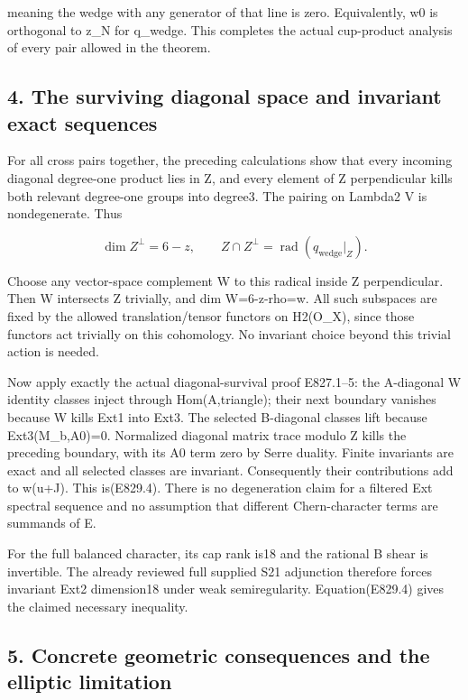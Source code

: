 meaning the wedge with any generator of that line is zero. Equivalently, w0
is orthogonal to z\_N for q\_wedge. This completes the actual cup-product
analysis of every pair allowed in the theorem.

\subsection{4. The surviving diagonal space and invariant exact
sequences}\label{SF-E829:the-surviving-diagonal-space-and-invariant-exact-sequences}

For all cross pairs together, the preceding calculations show that every
incoming diagonal degree-one product lies in Z, and every element of Z
perpendicular kills both relevant degree-one groups into degree3. The
pairing on Lambda2 V is nondegenerate. Thus

\[
 \dim Z^\perp=6-z,
 \qquad Z\cap Z^\perp=\operatorname{rad}(q_{\mathrm{wedge}}|_Z).
 \tag{E829.11}
\]

Choose any vector-space complement W to this radical inside Z perpendicular.
Then W intersects Z trivially, and dim W=6-z-rho=w. All such subspaces are
fixed by the allowed translation/tensor functors on H2(O\_X), since those
functors act trivially on this cohomology. No invariant choice beyond this
trivial action is needed.

Now apply exactly the actual diagonal-survival proof E827.1--5: the
A-diagonal W identity classes inject through Hom(A,triangle); their next
boundary vanishes because W kills Ext1 into Ext3. The selected B-diagonal
classes lift because Ext3(M\_b,A0)=0. Normalized diagonal matrix trace
modulo Z kills the preceding boundary, with its A0 term zero by Serre
duality. Finite invariants are exact and all selected classes are invariant.
Consequently their contributions add to w(u+\textbar J\textbar). This
is(E829.4). There is no degeneration claim for a filtered Ext spectral
sequence and no assumption that different Chern-character terms are summands
of E.

For the full balanced character, its cap rank is18 and the rational B shear
is invertible. The already reviewed full supplied S21 adjunction therefore
forces invariant Ext2 dimension18 under weak semiregularity.
Equation(E829.4) gives the claimed necessary inequality.

\subsection{5. Concrete geometric consequences and the elliptic
limitation}\label{SF-E829:concrete-geometric-consequences-and-the-elliptic-limitation}

